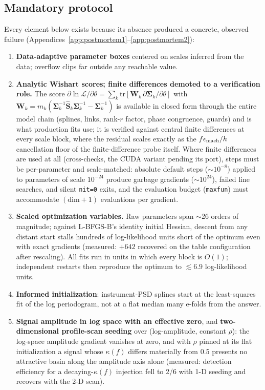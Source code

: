 \documentclass[11pt]{article}
\begin{document}
\subsection{Mandatory protocol}
\label{sec:diagnostics}
Every element below exists because its absence produced a concrete, observed failure (Appendices~\ref{app:postmortem1}--\ref{app:postmortem2}):
\begin{enumerate}
\item \textbf{Data-adaptive parameter boxes} centered on scales inferred from the data; overflow clips far outside any reachable value.
\item \textbf{Analytic Wishart scores; finite differences demoted to a verification role.} The score $\partial \ln\mathcal{L}/\partial\theta = \sum_k \mathrm{tr}[\mathbf{W}_k\, \partial\bm{\Sigma}_k/\partial\theta]$ with $\mathbf{W}_k = m_k(\bm{\Sigma}_k^{-1}\widehat{\mathbf{S}}_k\bm{\Sigma}_k^{-1} - \bm{\Sigma}_k^{-1})$ is available in closed form through the entire model chain (splines, links, rank-$r$ factor, phase congruence, guards) and is what production fits use; it is verified against central finite differences at every scale block, where the residual scales exactly as the $f\epsilon_{\rm mach}/h$ cancellation floor of the finite-difference probe itself. Where finite differences are used at all (cross-checks, the CUDA variant pending its port), steps must be per-parameter and scale-matched: absolute default steps ($\sim$$10^{-8}$) applied to parameters of scale $10^{-24}$ produce garbage gradients ($\sim$$10^{24}$), failed line searches, and silent \texttt{nit=0} exits, and the evaluation budget (\texttt{maxfun}) must accommodate $(\mathrm{dim}+1)$ evaluations per gradient.
\item \textbf{Scaled optimization variables.} Raw parameters span $\sim$26 orders of magnitude; against L-BFGS-B's identity initial Hessian, descent from any distant start stalls hundreds of log-likelihood units short of the optimum even with exact gradients (measured: $+642$ recovered on the table configuration after rescaling). All fits run in units in which every block is $O(1)$; independent restarts then reproduce the optimum to $\lesssim 6.9$ log-likelihood units.
\item \textbf{Informed initialization}: instrument-PSD splines start at the least-squares fit of the log periodogram, not at a flat median many e-folds from the answer.
\item \textbf{Signal amplitude in log space with an effective zero}, and \textbf{two-dimensional profile-scan seeding} over (log-amplitude, constant $\rho$): the log-space amplitude gradient vanishes at zero, and with $\rho$ pinned at its flat initialization a signal whose $\kappa(f)$ differs materially from 0.5 presents no attractive basin along the amplitude axis alone (measured: detection efficiency for a decaying-$\kappa(f)$ injection fell to 2/6 with 1-D seeding and recovers with the 2-D scan).

\end{enumerate}
\end{document}
